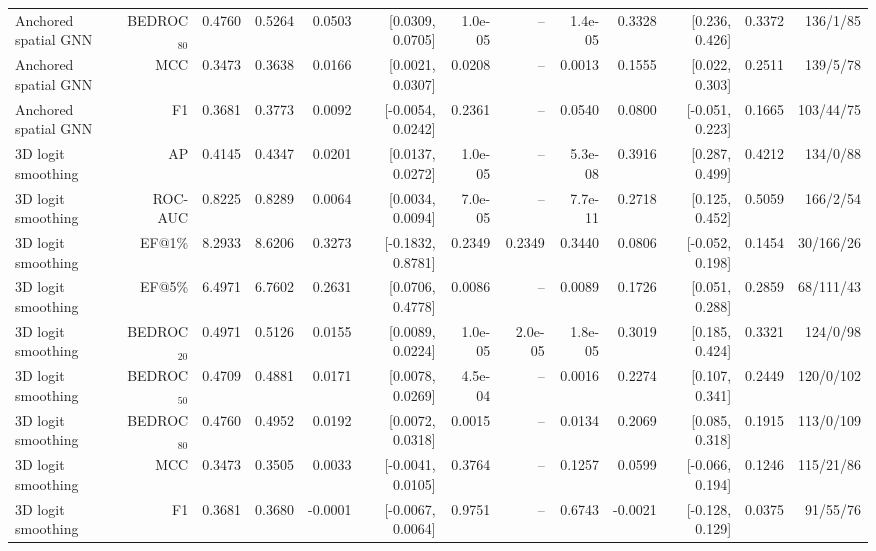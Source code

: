\begin{table}[t]
\begin{tabular}{lrrrrrrrrrrrr}
Anchored spatial GNN & BEDROC$_{80}$ & 0.4760 & 0.5264 & 0.0503 & [0.0309, 0.0705] & 1.0e-05 & -- & 1.4e-05 & 0.3328 & [0.236, 0.426] & 0.3372 & 136/1/85 \\
Anchored spatial GNN & MCC & 0.3473 & 0.3638 & 0.0166 & [0.0021, 0.0307] & 0.0208 & -- & 0.0013 & 0.1555 & [0.022, 0.303] & 0.2511 & 139/5/78 \\
Anchored spatial GNN & F1 & 0.3681 & 0.3773 & 0.0092 & [-0.0054, 0.0242] & 0.2361 & -- & 0.0540 & 0.0800 & [-0.051, 0.223] & 0.1665 & 103/44/75 \\
3D logit smoothing & AP & 0.4145 & 0.4347 & 0.0201 & [0.0137, 0.0272] & 1.0e-05 & -- & 5.3e-08 & 0.3916 & [0.287, 0.499] & 0.4212 & 134/0/88 \\
3D logit smoothing & ROC-AUC & 0.8225 & 0.8289 & 0.0064 & [0.0034, 0.0094] & 7.0e-05 & -- & 7.7e-11 & 0.2718 & [0.125, 0.452] & 0.5059 & 166/2/54 \\
3D logit smoothing & EF@1\% & 8.2933 & 8.6206 & 0.3273 & [-0.1832, 0.8781] & 0.2349 & 0.2349 & 0.3440 & 0.0806 & [-0.052, 0.198] & 0.1454 & 30/166/26 \\
3D logit smoothing & EF@5\% & 6.4971 & 6.7602 & 0.2631 & [0.0706, 0.4778] & 0.0086 & -- & 0.0089 & 0.1726 & [0.051, 0.288] & 0.2859 & 68/111/43 \\
3D logit smoothing & BEDROC$_{20}$ & 0.4971 & 0.5126 & 0.0155 & [0.0089, 0.0224] & 1.0e-05 & 2.0e-05 & 1.8e-05 & 0.3019 & [0.185, 0.424] & 0.3321 & 124/0/98 \\
3D logit smoothing & BEDROC$_{50}$ & 0.4709 & 0.4881 & 0.0171 & [0.0078, 0.0269] & 4.5e-04 & -- & 0.0016 & 0.2274 & [0.107, 0.341] & 0.2449 & 120/0/102 \\
3D logit smoothing & BEDROC$_{80}$ & 0.4760 & 0.4952 & 0.0192 & [0.0072, 0.0318] & 0.0015 & -- & 0.0134 & 0.2069 & [0.085, 0.318] & 0.1915 & 113/0/109 \\
3D logit smoothing & MCC & 0.3473 & 0.3505 & 0.0033 & [-0.0041, 0.0105] & 0.3764 & -- & 0.1257 & 0.0599 & [-0.066, 0.194] & 0.1246 & 115/21/86 \\
3D logit smoothing & F1 & 0.3681 & 0.3680 & -0.0001 & [-0.0067, 0.0064] & 0.9751 & -- & 0.6743 & -0.0021 & [-0.128, 0.129] & 0.0375 & 91/55/76 \\
\bottomrule
\end{tabular}
\end{table}
